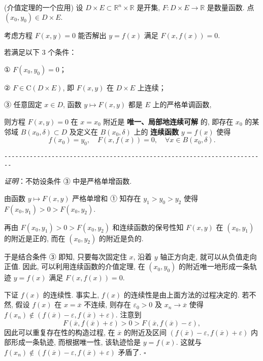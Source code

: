 

\begin{theorem}{(介值定理的一个应用)}
设 $D\times E\subset\mathbb{R}^{n}\times\mathbb{R}$ 是开集,
$F:D\times E\rightarrow\mathbb{R}$ 是数量函数. 点 $(x_{0},y_{0})\in D\times E.$ 

考虑方程 $F(x,y)=0$ 能否解出 $y=f(x)$ 满足 $F(x,f(x))=0.$ 

若满足以下 3 个条件：

① $F(x_{0},y_{0})=0$；

② $F\in\mathrm{C}(D\times E)$, 即 $F(x,y)$ 在 $D\times E$ 上连续；

③ 任意固定 $x\in D$, 函数 $y\mapsto F(x,y)$ 都是 $E$ 上的严格单调函数, 

则方程 $F(x,y)=0$ 在 $x=x_{0}$ 附近是\textbf{ 唯一、局部地连续可解} 的, 即存在 $x_{0}$
的某邻域 $B(x_{0},\delta)\subset D$ 及定义在 $B(x_{0},\delta)$ 上的\textbf{
连续函数} $y=f(x)$ 使得
\[
f(x_{0})=y_{0},\quad F(x,f(x))=0,\quad\forall x\in B(x_{0},\delta).
\]

\verb|------------------------------------------------------------------------|

\textsl{证明}：不妨设条件 ③ 中是严格单增函数. 

由函数 $y\mapsto F(x,y)$ 严格单增和 ① 知存在 $y_{1}>y_{0}>y_{2}$ 使得 $F(x_{0},y_{1})>0>F(x_{0},y_{2})$. 

再由 $F(x_{0},y_{1})>0>F(x_{0},y_{2})$ 和连续函数的保号性知 $F(x,y)$ 在 $(x_{0},y_{1})$
的附近是正的, 而在 $(x_{0},y_{2})$ 的附近是负的. 

于是结合条件 ③ 即知, 只要每次固定住 $x$, 沿着 $y$ 轴正方向走, 就可以从负值走向正值. 因此, 可以利用连续函数的介值定理,
在 $(x_{0},y_{0})$ 的附近唯一地形成一条轨迹 $y=f(x)$ 满足 $F(x,f(x))=0$. 

下证 $f(x)$ 的连续性. 事实上, $f(x)$ 的连续性是由上面方法的过程决定的. 若不然, 假设 $f(x)$ 在
$x=\overline{x}$ 不连续, 则存在 $\varepsilon_{0}>0$ 及 $x_{n}\rightarrow\overline{x}$
使得 $f(x_{n})\notin(f(\overline{x})-\varepsilon,f(\overline{x})+\varepsilon)$.
注意到
\[
F(\overline{x},f(\overline{x})+\varepsilon)>0>F(\overline{x},f(\overline{x})-\varepsilon),
\]
因此可以重复存在性的构造过程, 在 \textbf{$\overline{x}$ }的附近及区间 $(f(\overline{x})-\varepsilon,f(\overline{x})+\varepsilon)$
内部形成一条轨迹, 而根据唯一性, 该轨迹恰是 $y=f(x)$. 这就与 $f(x_{n})\notin(f(\overline{x})-\varepsilon,f(\overline{x})+\varepsilon)$
矛盾了. $\square$ 
\end{theorem}
\[
\]

